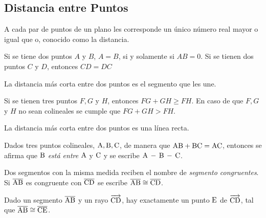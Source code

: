 \clearpage

\subsection{Distancia entre Puntos}

\begin{postulate}
A cada par de puntos de un plano les corresponde un único número real mayor o igual que o, conocido como la distancia.
\end{postulate}

\begin{postulate}
Si se tiene dos puntos $A$ y $B$, $A = B$, si y solamente si $AB = 0$.
Si se tienen dos puntos $C$ y $D$, entonces $CD = DC$
\end{postulate}

\begin{postulate}
La distancia más corta entre dos puntos es el segmento que les une.
\end{postulate}

\begin{theorem}
    Si se tienen tres puntos $F,G$ y $H$, entonces $FG + GH \ge FH$. En caso de que $F,G$ y $H$ no sean colineales se cumple que $FG + GH > FH$.

    \begin{corolary}
    La distancia más corta entre dos puntos es una línea recta.
    \end{corolary}
    
\end{theorem}

\begin{definition}
    Dados tres puntos colineales, $\rm A,B,C$, de manera que $\rm AB + \rm BC = \rm AC$, entonces se afirma que $\rm B$ \textit{está entre} $\rm A$ y $\rm C$ y se escribe $\rm A \,- \,B \,- \, C$.
\end{definition}

\begin{definition}
    Dos segmentos con la misma medida reciben el nombre de \textit{segmento congruentes}. Si $\overline{\rm AB}$ es congruente con $\overline{\rm CD}$ se escribe $\overline{\rm AB} \cong \overline{\rm CD}$.
\end{definition}

\begin{theorem}
    Dado un segmento $\overline{\rm AB}$ y un rayo $\overrightarrow{\rm CD}$, hay exactamente un punto $\rm E$ de $\overrightarrow{\rm CD}$, tal que $\overline{\rm AB} \cong \overline{\rm CE}$.   

\end{theorem}

